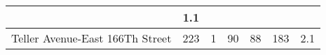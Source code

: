 {\begin{tabular}{l|c|c|c|c|c|c|}
                            & 1.1                                                                \\ \hline\multicolumn{1}{|l|}{\cellcolor{ccteallight}Teller Avenue-East 166Th Street}        & 223                                                   & 1                            & 90                                                   & 88                                                           & 183                                                                & 2.1                                                                \\ \hline
    \end{tabular}
    }
    